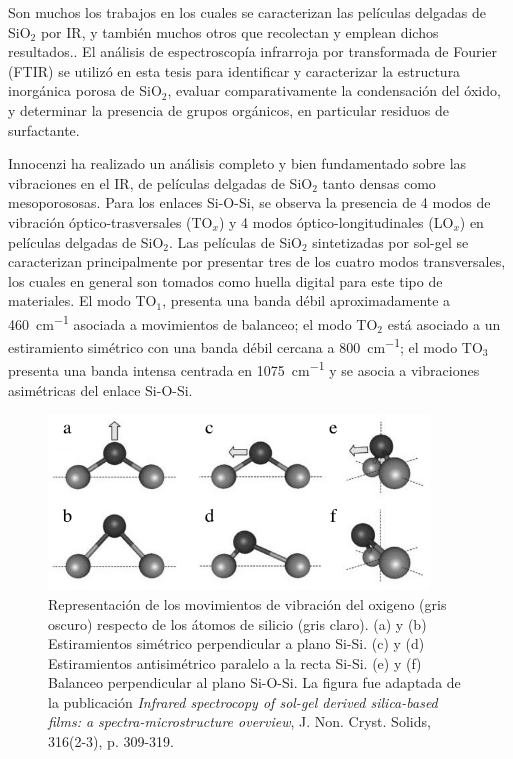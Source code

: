 		 Son muchos los trabajos en los cuales se caracterizan las películas delgadas de SiO$_2$ por IR\cite{Olsen1989,Almeida1990,Redol1997,Innocenzi2003}, y también muchos otros que recolectan y emplean dichos resultados.\cite{Angelome2008,Calvo2008,Calvo20210}.
		 El análisis de espectroscopía infrarroja por transformada de Fourier (FTIR) se utilizó en esta tesis para identificar y caracterizar la estructura inorgánica porosa de SiO$_2$, evaluar comparativamente la condensación del óxido, y determinar la presencia de grupos orgánicos, en particular residuos de surfactante. 

		Innocenzi ha realizado un análisis completo y bien fundamentado sobre las vibraciones en el IR, de películas delgadas de SiO$_2$ tanto densas como mesoporososas.\cite{Innocenzi2003} Para los enlaces Si-O-Si, se observa la presencia de 4 modos de vibración óptico-trasversales (TO$_x$) y 4 modos óptico-longitudinales (LO$_x$) en películas delgadas de SiO$_2$. Las películas de SiO$_2$ sintetizadas por sol-gel se caracterizan principalmente por presentar tres de los cuatro modos transversales, los cuales en general son tomados como huella digital para este tipo de materiales.\cite{Innocenzi2003,Angelome2008,Calvo2008} El modo TO$_1$, presenta una banda débil aproximadamente a \SI{460}{\cm^{-1}} asociada a movimientos de balanceo; el modo TO$_2$ está asociado a un estiramiento simétrico con una banda débil cercana a \SI{800}{\cm^{-1}}; el modo TO$_3$ presenta una banda intensa centrada en \SI{1075}{\cm^{-1}} y se asocia a vibraciones asimétricas del enlace Si-O-Si. 

		 		 \begin{figure}[!ht]
						\begin{center}
						\includegraphics[width=0.90\textwidth]{Imagenes/modos-infra.jpg}
						\caption[Modos de vibración Si-O-Si]{Representación de los movimientos de vibración del oxigeno (gris oscuro) respecto de los átomos de silicio (gris claro). (a) y (b) Estiramientos simétrico perpendicular a plano Si-Si. (c) y (d) Estiramientos antisimétrico paralelo a la recta Si-Si. (e) y (f) Balanceo perpendicular al plano Si-O-Si. La figura fue adaptada de la publicación \textit{Infrared spectrocopy of sol-gel derived silica-based films: a spectra-microstructure overview}, J. Non. Cryst. Solids, 316(2-3), p. 309-319.}
						\label{fig:modos-ir}
						\end{center}
						\end{figure}

